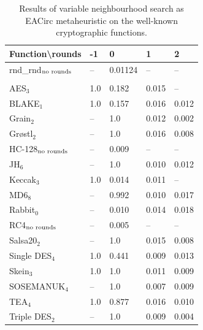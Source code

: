 \documentclass[
    digital,    %
    oneside,    %
    color,
    11pt,
    nocover,
    notable,
    nolof,
    nolot,
]{fithesis3}
\newcommand{\fd}{\cellcolor{red!25}}
\newcommand{\fn}{}
\begin{document}
\begin{table}[H]
\centering
\begin{tabular}{l|l l l l}
\textbf{\large Function\textbackslash{}rounds} & \textbf{\large -1} & \textbf{\large 0} & \textbf{\large 1} & \textbf{\large 2}\\ \hline
rnd\_rnd$_{\textnormal{no rounds}}$ & -- & \fn{}0.01124 & -- & --   \\\\
AES$_{3}$        & \fd{}1.0   & \fd{}0.182 & \fn{}0.015 & \fn{}--   \\
BLAKE$_{1}$      & \fd{}1.0   & \fd{}0.157 & \fn{}0.016 & \fn{}0.012\\
Grain$_{2}$      & \fd{}--    & \fd{}1.0   & \fn{}0.012 & \fn{}0.002\\
Gr\o stl$_{2}$   & \fd{}--    & \fd{}1.0   & \fn{}0.016 & \fn{}0.008\\
HC-128$_{\textnormal{no rounds}}$& -- & \fn{}0.009 & -- & --        \\
JH$_{6}$         & \fd{}--    & \fd{}1.0   & \fn{}0.010 & \fn{}0.012\\
Keccak$_{3}$     & \fd{}1.0   & \fn{}0.014 & \fn{}0.011 & \fn{}--   \\
MD6$_{8}$        & \fd{}--    & \fd{}0.992 & \fn{}0.010 & \fn{}0.017\\
Rabbit$_{0}$     &      --    & \fn{}0.010 & \fn{}0.014 & \fn{}0.018\\
RC4$_{\textnormal{no rounds}}$& -- & \fn{}0.005 & --    & --        \\
Salsa20$_{2}$    & \fd{}--    & \fd{}1.0   & \fn{}0.015 & \fn{}0.008\\
Single DES$_{4}$ & \fd{}1.0   & \fd{}0.441 & \fn{}0.009 & \fn{}0.013\\
Skein$_{3}$      & \fd{}1.0   & \fd{}1.0   & \fn{}0.011 & \fn{}0.009\\
SOSEMANUK$_{4}$  & \fd{}--    & \fd{}1.0   & \fn{}0.007 & \fn{}0.009\\
TEA$_{4}$        & \fd{}1.0   & \fd{}0.877 & \fn{}0.016 & \fn{}0.010\\
Triple DES$_{2}$ & \fd{}--    & \fd{}1.0   & \fn{}0.009 & \fn{}0.004
\end{tabular}
\caption{Results of variable neighbourhood search as EACirc metaheuristic on the well-known cryptographic functions.}
\label{table:res-usable-vns}
\end{table}
\end{document}

